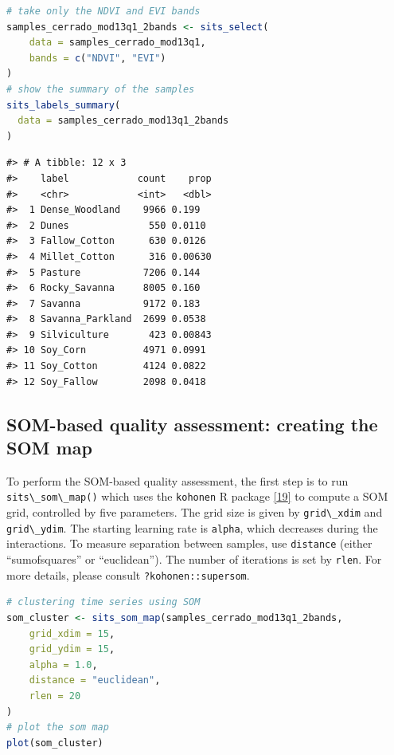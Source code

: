 \documentclass[
  11pt,
]{report}
\newcommand{\passthrough}[1]{#1}
\begin{document}
\begin{lstlisting}[language=R]
# take only the NDVI and EVI bands
samples_cerrado_mod13q1_2bands <- sits_select(
    data = samples_cerrado_mod13q1, 
    bands = c("NDVI", "EVI")
)
# show the summary of the samples
sits_labels_summary(
  data = samples_cerrado_mod13q1_2bands
)
\end{lstlisting}

\begin{lstlisting}
#> # A tibble: 12 x 3
#>    label            count    prop
#>    <chr>            <int>   <dbl>
#>  1 Dense_Woodland    9966 0.199  
#>  2 Dunes              550 0.0110 
#>  3 Fallow_Cotton      630 0.0126 
#>  4 Millet_Cotton      316 0.00630
#>  5 Pasture           7206 0.144  
#>  6 Rocky_Savanna     8005 0.160  
#>  7 Savanna           9172 0.183  
#>  8 Savanna_Parkland  2699 0.0538 
#>  9 Silviculture       423 0.00843
#> 10 Soy_Corn          4971 0.0991 
#> 11 Soy_Cotton        4124 0.0822 
#> 12 Soy_Fallow        2098 0.0418
\end{lstlisting}

\hypertarget{som-based-quality-assessment-creating-the-som-map}{%
\subsection*{SOM-based quality assessment: creating the SOM
map}\label{som-based-quality-assessment-creating-the-som-map}}

To perform the SOM-based quality assessment, the first step is to run
\passthrough{\lstinline!sits\_som\_map()!} which uses the
\passthrough{\lstinline!kohonen!} R package
\protect\hyperlink{ref-Wehrens2018}{{[}19{]}} to compute a SOM grid,
controlled by five parameters. The grid size is given by
\passthrough{\lstinline!grid\_xdim!} and
\passthrough{\lstinline!grid\_ydim!}. The starting learning rate is
\passthrough{\lstinline!alpha!}, which decreases during the
interactions. To measure separation between samples, use
\passthrough{\lstinline!distance!} (either ``sumofsquares'' or
``euclidean''). The number of iterations is set by
\passthrough{\lstinline!rlen!}. For more details, please consult
\passthrough{\lstinline!?kohonen::supersom!}.

\begin{lstlisting}[language=R]
# clustering time series using SOM
som_cluster <- sits_som_map(samples_cerrado_mod13q1_2bands,
    grid_xdim = 15,
    grid_ydim = 15,
    alpha = 1.0,
    distance = "euclidean",
    rlen = 20
)
# plot the som map
plot(som_cluster)
\end{lstlisting}
\end{document}
